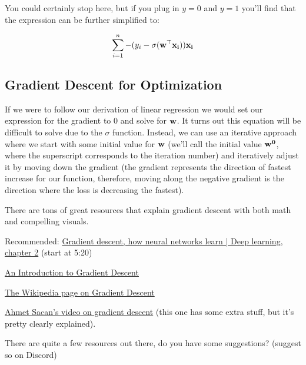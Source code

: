 \documentclass[assignment04_Solutions]{subfiles}
\begin{document}
\begin{exercise}[(60 minutes)]
\begin{boxedsolution}
You could certainly stop here, but if you plug in $y=0$ and $y=1$ you'll find that the expression can be further simplified to:
 
 \begin{align}
\sum_{i=1}^n  -(y_i - \sigma(\mathbf{w}^\top \mathbf{x_i})) \mathbf{x_i} \nonumber
 \end{align}


\end{boxedsolution}

\ees
\end{exercise}



\subsection{Gradient Descent for Optimization}
If we were to follow our derivation of linear regression we would set our expression for the gradient to 0 and solve for $\mathbf{w}$.  It turns out this equation will be difficult to solve due to the $\sigma$ function.  Instead, we can use an iterative approach where we start with some initial value for $\mathbf{w}$ (we'll call the initial value $\mathbf{w^0}$, where the superscript corresponds to the iteration number) and iteratively adjust it by moving down the gradient (the gradient represents the direction of fastest increase for our function, therefore, moving along the negative gradient is the direction where the loss is decreasing the fastest).



\vspace{1em}
\begin{externalresources}[(45 minutes)]
There are tons of great resources that explain gradient descent with both math and compelling visuals.
\bi
\item Recommended: \href{https://www.youtube.com/watch?v=IHZwWFHWa-w}{Gradient descent, how neural networks learn | Deep learning, chapter 2} (start at 5:20)
\item  \href{https://medium.com/@viveksingh.heritage/an-introduction-to-gradient-descent-54775b55ba4f}{An Introduction to Gradient Descent}
\item \href{https://en.wikipedia.org/wiki/Gradient_descent}{The Wikipedia page on Gradient Descent}
\item \href{https://www.youtube.com/watch?v=fPSPdTjINi0}{Ahmet Sacan's video on gradient descent} (this one has some extra stuff, but it's pretty clearly explained).
\item There are quite a few resources out there, do you have some suggestions? (suggest so on Discord)
\ei 
\end{externalresources}
\end{document}

